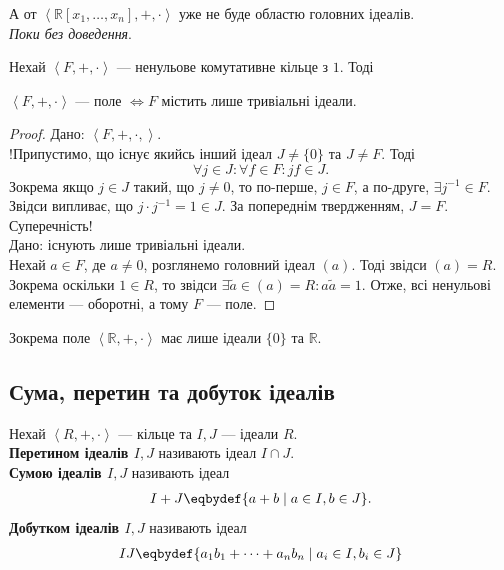 \documentclass{math_library}
\begin{document}
\begin{example}
А от $\left<\mathbb{R}[x_1,\dots,x_n], +, \cdot \right>$ уже не буде областю головних ідеалів.\\
\textit{Поки без доведення}.
\end{example}

\begin{theorem}
Нехай $\left< F,+,\cdot\right>$ --- ненульове комутативне кільце з $1$. Тоді
\begin{center}
$\left<F,+,\cdot\right>$ --- поле $\iff F$ містить лише тривіальні ідеали.
\end{center}
\end{theorem}

\begin{proof}
\rightproof Дано: $\left<F,+,\cdot,\right>$.\\
!Припустимо, що існує якийсь інший ідеал $J \neq \{0\}$ та $J \neq F$. Тоді
\[
\forall j \in J: \forall f \in F: jf \in J.
\]
Зокрема якщо $j \in J$ такий, що $j \neq 0$, то по-перше, $j \in F$, а по-друге, $\exists j^{-1} \in F$. Звідси випливає, що $j \cdot j^{-1} = 1 \in J$. За попереднім твердженням, $J = F$. Суперечність!
\bigskip \\
\leftproof Дано: існують лише тривіальні ідеали.\\
Нехай $a \in F$, де $a \neq 0$, розглянемо головний ідеал $(a)$. Тоді звідси $(a) = R$. Зокрема оскільки $1 \in R$, то звідси $\exists \tilde{a} \in (a) = R: a \tilde{a} = 1$. Отже, всі ненульові елементи --- оборотні, а тому $F$ --- поле.
\end{proof}

\begin{example}
Зокрема поле $\left< \mathbb{R},+,\cdot \right>$ має лише ідеали $\{0\}$ та $\mathbb{R}$.
\end{example}

\subsection{Сума, перетин та добуток ідеалів}
\begin{definition}
Нехай $\left<R,+,\cdot\right>$ --- кільце та $I,J$ --- ідеали $R$.\\
\textbf{Перетином ідеалів $I,J$} називають ідеал $I \cap J$.\\
\textbf{Сумою ідеалів $I,J$} називають ідеал
\begin{align*}
I+J \eqbydef \{ a+b \mid a \in I, b \in J \}.
\end{align*}
\textbf{Добутком ідеалів $I,J$} називають ідеал
\begin{align*}
IJ \eqbydef \{ a_1 b_1 + \dots + a_n b_n \mid a_i \in I, b_i \in J\}
\end{align*}
\end{definition}
\end{document}
